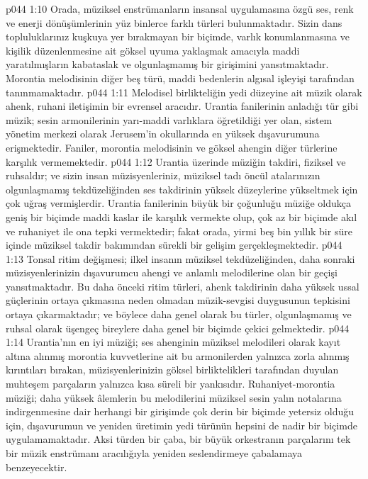 \vs p044 1:10 Orada, müziksel enstrümanların insansal uygulamasına özgü ses, renk ve enerji dönüşümlerinin yüz binlerce farklı türleri bulunmaktadır. Sizin dans topluluklarınız kuşkuya yer bırakmayan bir biçimde, varlık konumlanmasına ve kişilik düzenlenmesine ait göksel uyuma yaklaşmak amacıyla maddi yaratılmışların kabataslak ve olgunlaşmamış bir girişimini yansıtmaktadır. Morontia melodisinin diğer beş türü, maddi bedenlerin algısal işleyişi tarafından tanınmamaktadır.
\vs p044 1:11 Melodisel birlikteliğin yedi düzeyine ait müzik olarak ahenk, ruhani iletişimin bir evrensel aracıdır. Urantia fanilerinin anladığı tür gibi müzik; sesin armonilerinin yarı\hyp{}maddi varlıklara öğretildiği yer olan, sistem yönetim merkezi olarak Jerusem’in okullarında en yüksek dışavurumuna erişmektedir. Faniler, morontia melodisinin ve göksel ahengin diğer türlerine karşılık vermemektedir.
\vs p044 1:12 Urantia üzerinde müziğin takdiri, fiziksel ve ruhsaldır; ve sizin insan müzisyenleriniz, müziksel tadı öncül atalarınızın olgunlaşmamış tekdüzeliğinden ses takdirinin yüksek düzeylerine yükseltmek için çok uğraş vermişlerdir. Urantia fanilerinin büyük bir çoğunluğu müziğe oldukça geniş bir biçimde maddi kaslar ile karşılık vermekte olup, çok az bir biçimde akıl ve ruhaniyet ile ona tepki vermektedir; fakat orada, yirmi beş bin yıllık bir süre içinde müziksel takdir bakımından sürekli bir gelişim gerçekleşmektedir.
\vs p044 1:13 Tonsal ritim değişmesi; ilkel insanın müziksel tekdüzeliğinden, daha sonraki müzisyenlerinizin dışavurumcu ahengi ve anlamlı melodilerine olan bir geçişi yansıtmaktadır. Bu daha önceki ritim türleri, ahenk takdirinin daha yüksek ussal güçlerinin ortaya çıkmasına neden olmadan müzik\hyp{}sevgisi duygusunun tepkisini ortaya çıkarmaktadır; ve böylece daha genel olarak bu türler, olgunlaşmamış ve ruhsal olarak üşengeç bireylere daha genel bir biçimde çekici gelmektedir.
\vs p044 1:14 Urantia’nın en iyi müziği; ses ahenginin müziksel melodileri olarak kayıt altına alınmış morontia kuvvetlerine ait bu armonilerden yalnızca zorla alınmış kırıntıları bırakan, müzisyenlerinizin göksel birliktelikleri tarafından duyulan muhteşem parçaların yalnızca kısa süreli bir yankısıdır. Ruhaniyet\hyp{}morontia müziği; daha yüksek âlemlerin bu melodilerini müziksel sesin yalın notalarına indirgenmesine dair herhangi bir girişimde çok derin bir biçimde yetersiz olduğu için, dışavurumun ve yeniden üretimin yedi türünün hepsini de nadir bir biçimde uygulamamaktadır. Aksi türden bir çaba, bir büyük orkestranın parçalarını tek bir müzik enstrümanı aracılığıyla yeniden seslendirmeye çabalamaya benzeyecektir.
